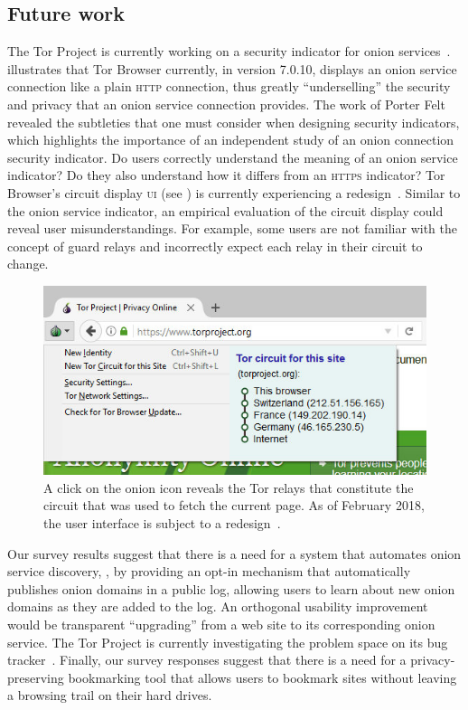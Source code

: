 \subsection{Future work}
\label{sec:future-work}

The Tor Project is currently working on a security indicator for onion
services~\cite{trac23247}.   illustrates that Tor
Browser currently, in version 7.0.10, displays an onion service connection like
a plain \textsc{http} connection, thus greatly ``underselling'' the security and
privacy that an onion service connection provides.  The work of Porter Felt
\ea~\cite{Felt2016a} revealed the subtleties that one must consider when
designing security indicators, which highlights the importance of an independent
study of an onion connection security indicator.  Do users correctly understand
the meaning of an onion service indicator?  Do they also understand how it
differs from an \textsc{https} indicator?  Tor Browser's circuit display
\textsc{ui} (see ) is currently experiencing a
redesign~\cite{trac24309}.  Similar to the onion service indicator, an empirical
evaluation of the circuit display could reveal user misunderstandings.  For
example, some users are not familiar with the concept of guard relays and
incorrectly expect each relay in their circuit to change.

\begin{figure}[t]
    \centering
    \includegraphics[width=\linewidth]{figures/tor-button-screenshot.jpg}
    \caption{A click on the onion icon reveals the Tor relays that constitute
    the circuit that was used to fetch the current page.  As of February 2018,
    the user interface is subject to a redesign~\cite{trac24309}.}
    \label{fig:tor-button}
\end{figure}

Our survey results suggest that there is a need for a system that automates
onion service discovery, \eg, by providing an opt-in mechanism that
automatically publishes onion domains in a public log, allowing users to learn
about new onion domains as they are added to the log.  An orthogonal usability
improvement would be transparent ``upgrading'' from a web site to its
corresponding onion service.  The Tor Project is currently investigating the
problem space on its bug tracker~\cite{trac21952}.  Finally, our survey
responses suggest that there is a need for a privacy-preserving bookmarking tool
that allows users to bookmark sites without leaving a browsing trail on their
hard drives.
